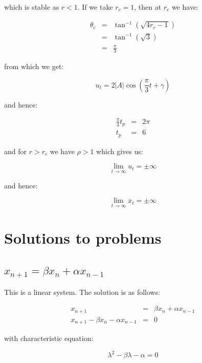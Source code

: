 \documentclass{report}
\begin{document}
which is stable as $r < 1$. If we take $r_c = 1$, then at $r_c$ we have: \bigskip

\begin{eqnarray*}
    \theta_c & = & \tan^{-1}(\sqrt{4 r_c - 1}) \\
             & = & \tan^{-1}(\sqrt{3}) \\
             & = & \frac{\pi}{3}
\end{eqnarray*}\medskip

from which we get: \bigskip

\[
    u_t = 2 \left| A \right| \cos(\frac{\pi}{3} t + \gamma)
\]\medskip

and hence: \bigskip

\begin{eqnarray*}
    \frac{\pi}{3} t_p & = & 2 \pi \\
                  t_p & = & 6
\end{eqnarray*}\medskip

and for $r > r_c$ we have $\rho > 1$ which gives us: \bigskip

\[
    \lim_{t \to \infty} u_t = \pm \infty
\]\medskip

and hence: \bigskip

\[
    \lim_{t \to \infty} x_t = \pm \infty
\]\medskip









\chapter{Solutions to problems}



\section{$x_{n + 1} = \beta x_n + \alpha x_{n - 1}$}

This is a linear system. The solution is as follows: \bigskip

\begin{eqnarray*}
                                   x_{n + 1} & = & \beta x_n + \alpha x_{n - 1} \\
    x_{n + 1} - \beta x_n - \alpha x_{n - 1} & = & 0
\end{eqnarray*}\medskip

with characteristic equation: \bigskip

\[
    \lambda^2 - \beta \lambda - \alpha = 0
\]\medskip
\end{document}
